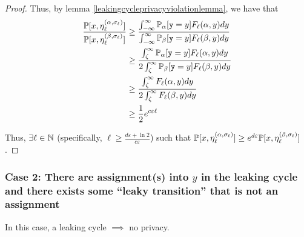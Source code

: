 \begin{proof}
	Thus, by lemma \ref{leakingcycleprivacyviolationlemma}, we have that \begin{align*}
		\frac{\mathbb{P}[x, \eta_\ell^{(\alpha, \sigma_\ell)}]}{\mathbb{P}[x, \eta_\ell^{(\beta, \sigma_\ell)}]}&\geq \frac{\int_{-\infty}^\infty\mathbb{P}_\alpha[\texttt{y}=y] F_\ell(\alpha, y)dy}{\int_{-\infty}^\infty\mathbb{P}_\beta[\texttt{y}=y] F_\ell(\beta, y)dy}\\
		&\geq \frac{\int_{\zeta}^\infty\mathbb{P}_\alpha[\texttt{y}=y] F_\ell(\alpha, y)dy}{2\int_{\zeta}^\infty\mathbb{P}_\beta[\texttt{y}=y] F_\ell(\beta, y)dy}\\
		&\geq \frac{\int_{\zeta}^\infty F_\ell(\alpha, y)dy}{2\int_{\zeta}^\infty F_\ell(\beta, y)dy}\\
		&\geq \frac{1}{2}e^{c\varepsilon\ell}
	\end{align*}
	
	Thus, $\exists \ell\in \mathbb{N}$ (specifically, $\ell \geq \frac{d\varepsilon+\ln 2}{c\varepsilon}$) such that $\mathbb{P}[x, \eta_\ell^{(\alpha, \sigma_\ell)}]\geq e^{d\varepsilon}\mathbb{P}[x, \eta_\ell^{(\beta, \sigma_\ell)}]$. 
\end{proof}

\subsubsection{Case 2: There are assignment(s) into $y$ in the leaking cycle and there exists some ``leaky transition'' that is not an assignment}

\begin{thm}
	In this case, a leaking cycle $\implies$ no privacy.
\end{thm}

